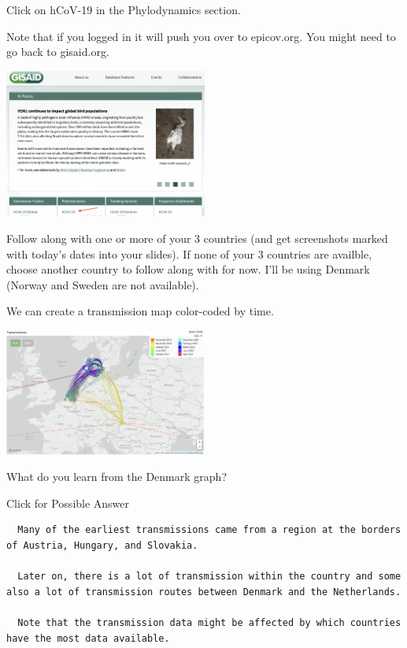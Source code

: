 \documentclass[
]{book}
\begin{document}
Click on hCoV-19 in the Phylodynamics section.

Note that if you logged in it will push you over to epicov.org. You might need to go back to gisaid.org.

\includegraphics[width=0.5\textwidth,height=\textheight]{./Figures/Phylodynamics.png}

Follow along with one or more of your 3 countries (and get screenshots marked with today's dates into your slides). If none of your 3 countries are availble, choose another country to follow along with for now. I'll be using Denmark (Norway and Sweden are not available).

We can create a transmission map color-coded by time.

\includegraphics[width=0.5\textwidth,height=\textheight]{./Figures/DenmarkTransmission.png}

What do you learn from the Denmark graph?

Click for Possible Answer

\begin{verbatim}
  Many of the earliest transmissions came from a region at the borders of Austria, Hungary, and Slovakia.
  
  Later on, there is a lot of transmission within the country and some also a lot of transmission routes between Denmark and the Netherlands.
  
  Note that the transmission data might be affected by which countries have the most data available.
\end{verbatim}

\hfill\break
\end{document}
